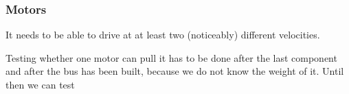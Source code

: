 \subsubsection{Motors}

It needs to be able to drive at at least two (noticeably) different velocities.

Testing whether one motor can pull it has to be done after the last component and after the bus has been built, because we do not know the weight of it. 
Until then we can test 

